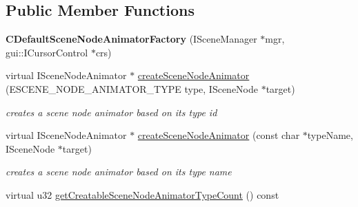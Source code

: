 \subsection*{Public Member Functions}
\begin{DoxyCompactItemize}
\item 
\hypertarget{classirr_1_1scene_1_1_c_default_scene_node_animator_factory_af9ec8cd1c1bc77051b7429012be0786f}{{\bfseries C\-Default\-Scene\-Node\-Animator\-Factory} (I\-Scene\-Manager $\ast$mgr, gui\-::\-I\-Cursor\-Control $\ast$crs)}\label{classirr_1_1scene_1_1_c_default_scene_node_animator_factory_af9ec8cd1c1bc77051b7429012be0786f}

\item 
virtual I\-Scene\-Node\-Animator $\ast$ \hyperlink{classirr_1_1scene_1_1_c_default_scene_node_animator_factory_af70fd6b4dc422d6b375e48a24f6090d7}{create\-Scene\-Node\-Animator} (E\-S\-C\-E\-N\-E\-\_\-\-N\-O\-D\-E\-\_\-\-A\-N\-I\-M\-A\-T\-O\-R\-\_\-\-T\-Y\-P\-E type, I\-Scene\-Node $\ast$target)
\begin{DoxyCompactList}\small\item\em creates a scene node animator based on its type id \end{DoxyCompactList}\item 
virtual I\-Scene\-Node\-Animator $\ast$ \hyperlink{classirr_1_1scene_1_1_c_default_scene_node_animator_factory_afe50931ca4959d65d913dde0ef6017ff}{create\-Scene\-Node\-Animator} (const char $\ast$type\-Name, I\-Scene\-Node $\ast$target)
\begin{DoxyCompactList}\small\item\em creates a scene node animator based on its type name \end{DoxyCompactList}\item 
\hypertarget{classirr_1_1scene_1_1_c_default_scene_node_animator_factory_af79bc33d7240115ae9dc9cde2c3068f3}{virtual u32 \hyperlink{classirr_1_1scene_1_1_c_default_scene_node_animator_factory_af79bc33d7240115ae9dc9cde2c3068f3}{get\-Creatable\-Scene\-Node\-Animator\-Type\-Count} () const }\label{classirr_1_1scene_1_1_c_default_scene_node_animator_factory_af79bc33d7240115ae9dc9cde2c3068f3}


\end{DoxyCompactItemize}
